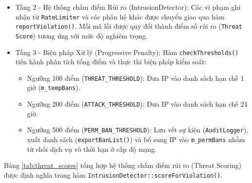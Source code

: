 \begin{enumerate}
\begin{itemize}[label={-}]
        \item Tầng 2 - Hệ thống chấm điểm Rủi ro (IntrusionDetector): Các vi phạm ghi nhận từ \texttt{RateLimiter} và các phân hệ khác được chuyển giao qua hàm \texttt{reportViolation()}. Mỗi mã lỗi được quy đổi thành điểm số rủi ro (\texttt{Threat Score}) tương ứng với mức độ nghiêm trọng.
        
        \item Tầng 3 - Biện pháp Xử lý (Progressive Penalty): Hàm \texttt{checkThresholds()} tiến hành phân tích tổng điểm và thực thi biện pháp kiểm soát:
        \begin{itemize}[label={$\circ$}]
            \item Ngưỡng 100 điểm (\texttt{THREAT\_THRESHOLD}): Đưa IP vào danh sách hạn chế 1 giờ (\texttt{m\_tempBans}).
            \item Ngưỡng 200 điểm (\texttt{ATTACK\_THRESHOLD}): Đưa IP vào danh sách hạn chế 24 giờ.
            \item Ngưỡng 500 điểm (\texttt{PERM\_BAN\_THRESHOLD}): Lưu vết sự kiện (\texttt{AuditLogger}), xuất danh sách (\texttt{exportBanList()}) và bổ sung IP vào \texttt{m\_permBans} nhằm từ chối dịch vụ vô thời hạn ở cấp độ mạng.
        \end{itemize}
    \end{itemize}
\end{enumerate}

Bảng \ref{tab:threat_scores} tổng hợp hệ thống chấm điểm rủi ro (Threat Scoring) được định nghĩa trong hàm \texttt{IntrusionDetector::scoreForViolation()}.

